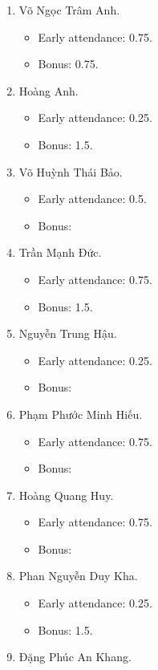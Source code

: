 \documentclass{article}
\begin{document}
\begin{enumerate}
	\item {\sc Võ Ngọc Trâm Anh.}
	\begin{itemize}
		\item Early attendance: 0.75.
		\item Bonus: 0.75.
	\end{itemize}
	\item {\sc Hoàng Anh.}
	\begin{itemize}
		\item Early attendance: 0.25.
		\item Bonus: 1.5.
	\end{itemize}
	\item {\sc Võ Huỳnh Thái Bảo.}
	\begin{itemize}
		\item Early attendance: 0.5.
		\item Bonus: 
	\end{itemize}
	\item {\sc Trần Mạnh Đức.}
	\begin{itemize}
		\item Early attendance: 0.75.
		\item Bonus: 1.5.
	\end{itemize}
	\item {\sc Nguyễn Trung Hậu.}
	\begin{itemize}
		\item Early attendance: 0.25.
		\item Bonus: 
	\end{itemize}
	\item {\sc Phạm Phước Minh Hiếu.}
	\begin{itemize}
		\item Early attendance: 0.75.
		\item Bonus: 
	\end{itemize}
	\item {\sc Hoàng Quang Huy.}
	\begin{itemize}
		\item Early attendance: 0.75.
		\item Bonus: 
	\end{itemize}
	\item {\sc Phan Nguyễn Duy Kha.}
	\begin{itemize}
		\item Early attendance: 0.25.
		\item Bonus: 1.5.
	\end{itemize}
	\item {\sc Đặng Phúc An Khang.}

\end{enumerate}
\end{document}
